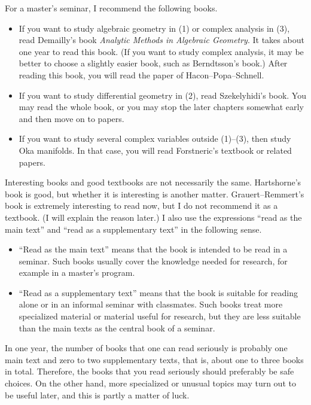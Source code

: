For a master's seminar, I recommend the following books.
\begin{tcolorbox}[mybox]
\begin{itemize}[left=0pt]
  \setlength{\parskip}{0cm} %
  \setlength{\itemsep}{8pt} %
\item If you want to study algebraic geometry in (1) or complex analysis in (3), read Demailly's book \emph{Analytic Methods in Algebraic Geometry}. It takes about one year to read this book. (If you want to study complex analysis, it may be better to choose a slightly easier book, such as Berndtsson's book.) After reading this book, you will read the paper of Hacon--Popa--Schnell.  
\item If you want to study differential geometry in (2), read Szekelyhidi's book. You may read the whole book, or you may stop the later chapters somewhat early and then move on to papers. 
\item If you want to study several complex variables outside (1)--(3), then study Oka manifolds. In that case, you will read Forstneric's textbook or related papers.
\end{itemize}
\end{tcolorbox}

\vspace{8pt}
Interesting books and good textbooks are not necessarily the same. Hartshorne's book  is good, but whether it is interesting is another matter. 
Grauert--Remmert's book  is extremely interesting to read now, but I do not recommend it as a textbook. (I will explain the reason later.) I also use the expressions ``read as the main text'' and ``read as a supplementary text'' in the following sense.
\begin{itemize}
  \setlength{\parskip}{0cm} %
  \setlength{\itemsep}{0pt} %
\item ``Read as the main text'' means that the book is intended to be read in a seminar. Such books usually cover the knowledge needed for research, for example in a master's program.
\item ``Read as a supplementary text'' means that the book is suitable for reading alone or in an informal seminar with classmates. Such books treat more specialized material or material useful for research, but they are less suitable than the main texts as the central book of a seminar.
\end{itemize}
In one year, the number of books that one can read seriously is probably one main text and zero to two supplementary texts, that is, about one to three books in total. 
Therefore, the books that you read seriously should preferably be safe choices. On the other hand, more specialized or unusual topics may turn out to be useful later, and this is partly a matter of luck.

